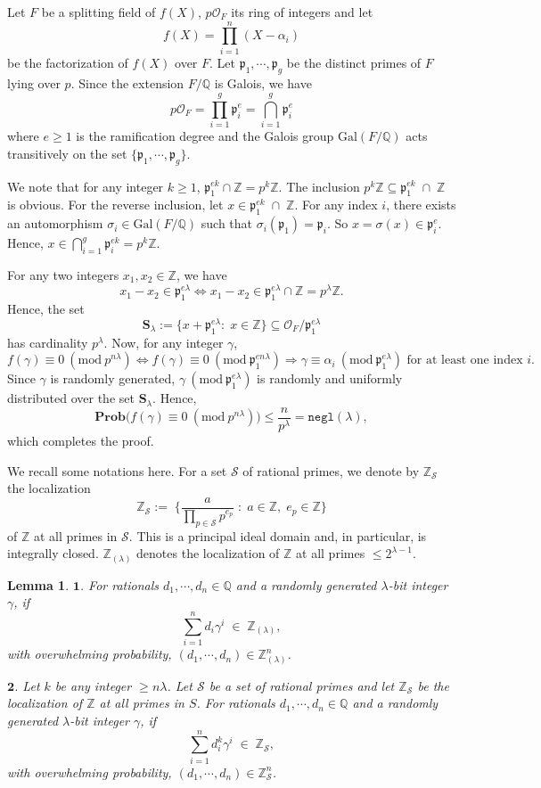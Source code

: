 \documentclass[11pt, lettersize, notitlepage, leqno, footskip=0.6cm]{article}
\newcommand{\bz}{\mathbb Z}
\newcommand{\bq}{\mathbb Q}
\newcommand{\pl}{\prod\limits}
\newcommand{\slim}{\sum\limits}
\newcommand{\ttt}{\texttt}
\newcommand{\Gal}{\mathrm{Gal}}
\newcommand{\negl}{\ttt{{negl}}}
\newcommand{\LRA}{\Longleftrightarrow}
\newcommand{\mc}{\mathcal}
\newcommand{\mbf}{\mathbf}
\newcommand{\mfp}{\mathfrak{p}}
\newcommand{\al}{\alpha}
\newcommand{\lam}{\lambda}
\newcommand{\bzlam}{\bz_{(\lam)}}
\newcommand{\sub}{\subseteq}
\newcommand{\vs}{\vspace{-0.15cm}}
\newcommand{\noin}{\noindent}
\newcommand{\op}{overwhelming probability}
\newcommand{\Mod}[1]{\ (\mathrm{mod}\ #1)}
\newtheorem{Lem}[Thm]{Lemma}
\numberwithin{equation}{section}
\begin{document}
\begin{prf} Let $F$ be a splitting field of $f(X)$, $p\mc{O}_F$ its ring of integers and let \vs $${f}(X) = \pl_{i=1}^n (X-\al_i)$$ be the factorization of ${f}(X)$ over $F$. Let $\mfp_{1},\cdots,\mfp_g$ be the distinct primes of $F$ lying over $p$. Since the extension $F/\bq$ is Galois, we have \vs $$p\mc{O}_F = \pl_{i=1}^{g} \mfp_i^e = \bigcap\limits_{i=1}^{g} \mfp_i^e$$ where $e\geq 1$ is the ramification degree and the Galois group $\Gal(F/\bq)$ acts transitively on the set $\{ \mfp_1,\cdots,\mfp_g\}$.

We note that for any integer $k\geq 1$, $\mfp_1^{ek}\cap \bz = p^{k}\bz$. The inclusion $p^{k}\bz\sub \mfp_1^{ek}\;\cap \;\bz$ is obvious. For the reverse inclusion, let $x\in \mfp_1^{ek}\;\cap\; \bz$. For any index $i$, there exists an automorphism $\sigma_i\in \Gal(F/\bq)$ such that $\sigma_i(\mfp_1) = \mfp_i$. So $x = \sigma(x) \in \mfp_i^e$. Hence, $x\in \bigcap\limits_{i=1}^g \mfp_i^{ek} = p^{k}\bz$.

\noin For any two integers $x_1,x_2\in \bz$, we have \vs $$x_1-x_2\in \mfp_1^{e\lam}\LRA x_1-x_2\in \mfp_1^{e\lam}\cap \bz = p^{\lam}\bz.$$ Hence, the set \vs $$ \mbf{S}_{\lam}:= \{x + {\mfp_1^{e\lam}}:\;x\in\bz \}\sub \mc{O}_F/\mfp_1^{e\lam} $$ has cardinality $p^{\lam}$. Now, for any integer $\gamma$, \vs $$f(\gamma)\equiv 0 \Mod{p^{n\lam}} \LRA f(\gamma)\equiv 0 \Mod{\mfp_1^{en\lam}}  \Longrightarrow \gamma\equiv \al_i \Mod{\mfp_1^{e\lam}}\text{ for at least one index } i. $$  Since $\gamma$ is randomly generated, $\gamma\Mod{\mfp_1^{e\lam}}$ is randomly and uniformly distributed over the set $\mbf{S}_{\lam}$. Hence, \vs $$ \mbf{Prob}\big( f(\gamma)\equiv 0 \Mod{p^{n\lam}} \big)\leq \frac{n}{p^{\lam}} = \negl(\lam),$$ which completes the proof.\end{prf}

\noin We recall some notations here. For a set $\mc{S}$ of rational primes, we denote by $\bz_{\mc{S}}$ the localization \vs $$\bz_{\mc{S}}:= \;\Big\{\frac{a}{\pl_{p\in \mc{S}} p^{e_p}}\;:\;a\in\bz,\; e_p\in \bz \Big\} $$ of $\bz$ at all primes in $\mc{S}$. This is a principal ideal domain and, in particular, is integrally closed. $\bz_{(\lam)}$ denotes the localization of $\bz$ at all primes $\leq 2^{\lam-1}$. 

\begin{Lem}$\mbf{1}$. For rationals $d_1,\cdots, d_n\in \bq$ and a randomly generated $\lam$-bit integer $\gamma$, if \vs$$\sum\limits_{i=1}^n d_i\gamma^i\; \in \;\bzlam,$$ with \op, $(d_1,\cdots, d_n)\in \bzlam^n$.\vspace{0.1cm}

\noin $\mbf{2}$. Let $k$ be any integer $\geq n\lam$. Let $\mc{S}$ be a set of rational primes and let $\bz_{\mc{S}}$ be the localization of $\bz$ at all primes in $S$. For rationals $d_1,\cdots, d_n\in \bq$ and a randomly generated $\lam$-bit integer $\gamma$, if \vs $$\slim_{i=1}^n d_i^{k}\gamma^i\; \in \;\bz_{\mc{S}},$$ with \op, $(d_1,\cdots, d_n)\in \bz_{\mc{S}}^n$.
\end{Lem}
\end{document}
